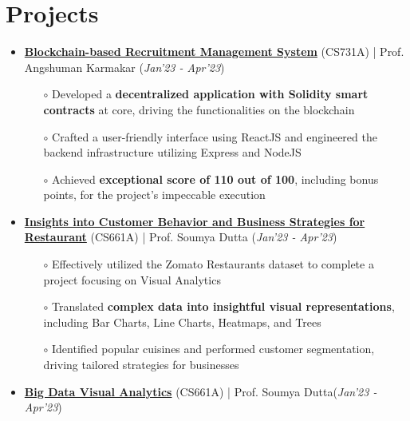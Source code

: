 \documentclass[10.8pt, a4paper]{extarticle}
\newcommand{\shorterSection}[1]{\vspace{-10pt}\section{#1}}
\begin{document}
\shorterSection{Projects}
\vspace{-2pt}
\begin{itemize}
   

  \item \href{https://github.com/vamshimorlawar/Reconchain} {\textbf{Blockchain-based Recruitment Management System}} (CS731A) | Prof. Angshuman Karmakar  \hfill\hfill(\textit{Jan'23 - Apr'23})
  \begin{itemize}
    \item[$\circ$] Developed a \textbf{decentralized application with Solidity smart contracts} at core, driving the functionalities on the blockchain\\[-0.6cm]
    \item[$\circ$] Crafted a user-friendly interface using ReactJS and engineered the backend infrastructure utilizing Express and NodeJS\\[-0.6cm]
    \item[$\circ$] Achieved \textbf{exceptional score of 110 out of 100}, including bonus points, for the project's impeccable execution \\[-0.6cm]
  \end{itemize}
  \vspace{0.055cm}
  \item \href{https://github.com/Vinay-Agrawal29/CS661_bizviz} {\textbf{Insights into Customer Behavior and Business Strategies for Restaurant}} (CS661A) | Prof. Soumya Dutta  \hfill\hfill(\textit{Jan'23 - Apr'23})
  \begin{itemize}
    \item[$\circ$] Effectively utilized the Zomato Restaurants dataset to complete a project focusing on Visual Analytics\\[-0.6cm]
    \item[$\circ$] Translated \textbf{complex data into insightful visual representations}, including Bar Charts, Line Charts, Heatmaps, and Trees \\[-0.6cm]
    \item[$\circ$] Identified popular cuisines and performed customer segmentation, driving tailored strategies for businesses \\[-0.6cm]
  \end{itemize}
  \vspace{0.055cm}
  \item \href{https://github.com/vamshimorlawar/CS661} {\textbf{Big Data Visual Analytics}} (CS661A) | Prof. Soumya Dutta\hfill\hfill(\textit{Jan'23 - Apr'23})

\end{itemize}
\end{document}
